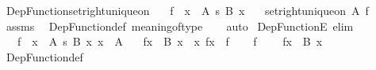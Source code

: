 \begin{isabellebody}
\endisatagproof
{\isafoldproof}%
%
\isadelimproof
\isanewline
%
\endisadelimproof
\isanewline
{}\isamarkupfalse%
\ Dep{\isacharunderscore}{\kern0pt}Function{\isacharunderscore}{\kern0pt}set{\isacharunderscore}{\kern0pt}right{\isacharunderscore}{\kern0pt}unique{\isacharunderscore}{\kern0pt}on{\isacharcolon}{\kern0pt}\isanewline
\ \ \ {\isachardoublequoteopen}f\ {\isacharcolon}{\kern0pt}\ {\isacharparenleft}{\kern0pt}x\ {\isacharcolon}{\kern0pt}\ A{\isacharparenright}{\kern0pt}\ {\isasymrightarrow}s\ B\ x{\isachardoublequoteclose}\isanewline
\ \ \ {\isachardoublequoteopen}set{\isacharunderscore}{\kern0pt}right{\isacharunderscore}{\kern0pt}unique{\isacharunderscore}{\kern0pt}on\ A\ f{\isachardoublequoteclose}\isanewline
\ \ \isanewline
%
\isadelimproof
\ \ %
\endisadelimproof
%
\isatagproof
{}\isamarkupfalse%
\ assms\ \isamarkupfalse%
\ Dep{\isacharunderscore}{\kern0pt}Function{\isacharunderscore}{\kern0pt}def\ meaning{\isacharunderscore}{\kern0pt}of{\isacharunderscore}{\kern0pt}type\isanewline
\ \ \isamarkupfalse%
\ auto%
\endisatagproof
{\isafoldproof}%
%
\isadelimproof
\isanewline
%
\endisadelimproof
\isanewline
{}\isamarkupfalse%
\ Dep{\isacharunderscore}{\kern0pt}FunctionE\ {\isacharbrackleft}{\kern0pt}elim{\isacharbrackright}{\kern0pt}{\isacharcolon}{\kern0pt}\isanewline
\ \ \ {\isachardoublequoteopen}f\ {\isacharcolon}{\kern0pt}\ {\isacharparenleft}{\kern0pt}x\ {\isacharcolon}{\kern0pt}\ A{\isacharparenright}{\kern0pt}\ {\isasymrightarrow}s\ B\ x{\isachardoublequoteclose}\ {\isachardoublequoteopen}x\ {\isacharcolon}{\kern0pt}\ A{\isachardoublequoteclose}\isanewline
\ \ \ {\isachardoublequoteopen}f{\isacharbackquote}{\kern0pt}x\ {\isacharcolon}{\kern0pt}\ B\ x{\isachardoublequoteclose}\ \ {\isachardoublequoteopen}{\isasymlangle}x{\isacharcomma}{\kern0pt}\ f{\isacharbackquote}{\kern0pt}x{\isasymrangle}\ {\isasymin}\ f{\isachardoublequoteclose}\isanewline
%
\isadelimproof
%
\endisadelimproof
%
\isatagproof
{}\isamarkupfalse%
\isanewline
\ \ \isamarkupfalse%
\ {\isacartoucheopen}f\ {\isacharcolon}{\kern0pt}\ {\isacharunderscore}{\kern0pt}{\isacartoucheclose}\ \isamarkupfalse%
\ {\isachardoublequoteopen}f{\isacharbackquote}{\kern0pt}x\ {\isacharcolon}{\kern0pt}\ B\ x{\isachardoublequoteclose}\ \isamarkupfalse%
\ Dep{\isacharunderscore}{\kern0pt}Function{\isacharunderscore}{\kern0pt}def\ \isamarkupfalse%

\end{isabellebody}
